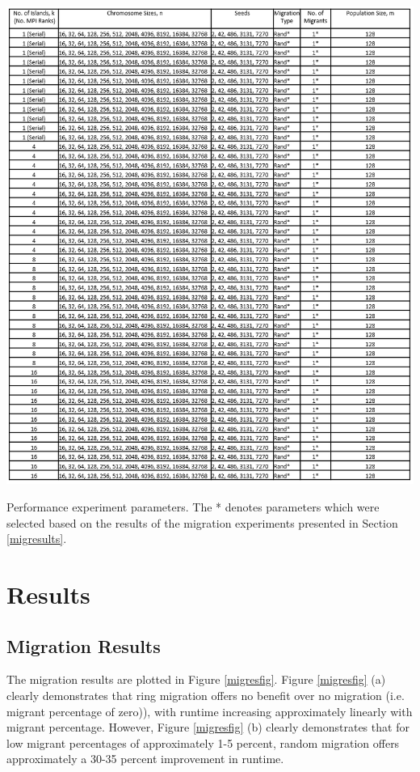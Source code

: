 \documentclass{report}
\begin{document}
\begin{table}[H]
\includegraphics[scale=0.71]{performance_experiments}
\caption{Performance experiment parameters. The * denotes parameters which were selected based on the results of the migration experiments presented in Section \ref{migresults}.}\label{perftab}
\end{table}
\section{Results}
\subsection{Migration Results}
The migration results are plotted in Figure \ref{migresfig}. Figure \ref{migresfig} (a) clearly demonstrates that ring migration offers no benefit over no migration (i.e. migrant percentage of zero)), with runtime increasing approximately linearly with migrant percentage. However, Figure \ref{migresfig} (b) clearly demonstrates that for low migrant percentages of approximately 1-5 percent, random migration offers approximately a 30-35 percent improvement in runtime.
\end{document}
